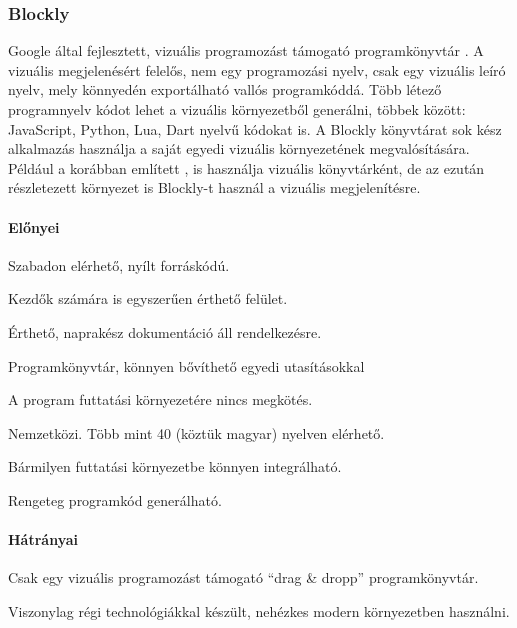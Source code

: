 \documentclass[12pt,a4paper,oneside]{report} %
\begin{document}
\subsubsection{Blockly}
\label{blocly}
Google által fejlesztett, vizuális programozást támogató programkönyvtár \cite{BlocklyUrl2020Feb} \cite{pasternak2017tips}. A vizuális megjelenésért felelős, nem egy programozási nyelv, csak egy vizuális leíró nyelv, mely könnyedén exportálható vallós programkóddá. Több létező programnyelv kódot lehet a vizuális környezetből generálni, többek között: JavaScript, Python, Lua, Dart nyelvű kódokat is. A Blockly könyvtárat sok kész alkalmazás használja a saját egyedi vizuális környezetének megvalósítására.
Például a korábban említett ,  is használja vizuális könyvtárként, de az ezután részletezett  környezet is Blockly-t használ a vizuális megjelenítésre.
\paragraph{Előnyei} 
\begin{compactitem}
	\item Szabadon elérhető, nyílt forráskódú.
	\item Kezdők számára is egyszerűen érthető felület.
	\item Érthető, naprakész dokumentáció áll rendelkezésre.
	\item Programkönyvtár, könnyen bővíthető egyedi utasításokkal
	\item A program futtatási környezetére nincs megkötés.
	\item Nemzetközi. Több mint 40 (köztük magyar) nyelven elérhető.
	\item Bármilyen futtatási környezetbe könnyen integrálható.
	\item Rengeteg programkód generálható.
\end{compactitem}
\paragraph{Hátrányai} 
\begin{compactitem}
	\item Csak egy vizuális programozást támogató  ``drag \& dropp'' programkönyvtár.
	\item Viszonylag régi technológiákkal készült, nehézkes modern környezetben használni.
\end{compactitem}
\end{document}
